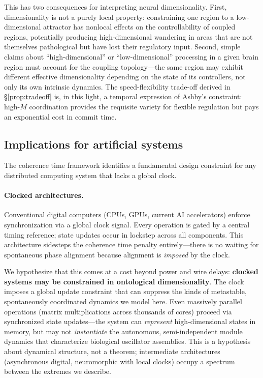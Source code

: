 \documentclass[12pt]{article}
\begin{document}
This has two consequences for interpreting neural dimensionality. First, dimensionality is not a purely local property: constraining one region to a low-dimensional attractor has nonlocal effects on the controllability of coupled regions, potentially producing high-dimensional wandering in areas that are not themselves pathological but have lost their regulatory input. Second, simple claims about ``high-dimensional'' or ``low-dimensional'' processing in a given brain region must account for the coupling topology---the same region may exhibit different effective dimensionality depending on the state of its controllers, not only its own intrinsic dynamics. The speed-flexibility trade-off derived in \S\ref{prop:tradeoff} is, in this light, a temporal expression of Ashby's constraint: high-$M$ coordination provides the requisite variety for flexible regulation but pays an exponential cost in commit time.

\subsection{Implications for artificial systems}

The coherence time framework identifies a fundamental design constraint for any distributed computing system that lacks a global clock.

\paragraph{Clocked architectures.} Conventional digital computers (CPUs, GPUs, current AI accelerators) enforce synchronization via a global clock signal. Every operation is gated by a central timing reference; state updates occur in lockstep across all components. This architecture sidesteps the coherence time penalty entirely---there is no waiting for spontaneous phase alignment because alignment is \emph{imposed} by the clock.

We hypothesize that this comes at a cost beyond power and wire delays: \textbf{clocked systems may be constrained in ontological dimensionality}. The clock imposes a global update constraint that can suppress the kinds of metastable, spontaneously coordinated dynamics we model here. Even massively parallel operations (matrix multiplications across thousands of cores) proceed via synchronized state updates---the system can \emph{represent} high-dimensional states in memory, but may not \emph{instantiate} the autonomous, semi-independent module dynamics that characterize biological oscillator assemblies. This is a hypothesis about dynamical structure, not a theorem; intermediate architectures (asynchronous digital, neuromorphic with local clocks) occupy a spectrum between the extremes we describe.
\end{document}
